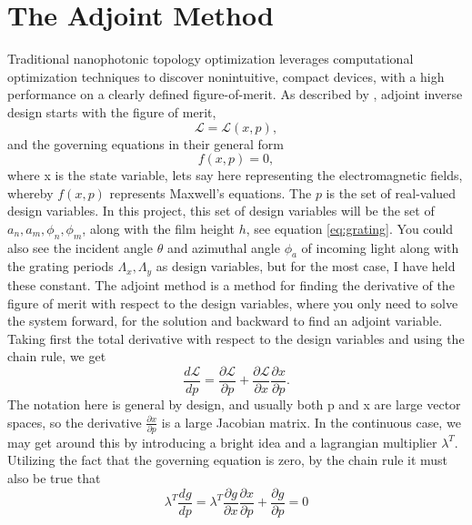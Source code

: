 \section{The Adjoint Method}
\label{sec:adjoint}
Traditional nanophotonic topology optimization leverages computational optimization techniques to discover nonintuitive, compact devices, with a high performance
on a clearly defined figure-of-merit. As described by \cite{Hughes2018}, adjoint inverse design starts with the figure of merit,
\begin{equation}
\label{eq:FoM}
\mathcal{L}=\mathcal{L}(x,p),
\end{equation}
and the governing equations in their general form
\begin{equation}
\label{eq:constrainAdjoint}
f(x,p) = 0,
\end{equation}
where x is the state variable, lets say here representing the
electromagnetic fields, whereby $f(x,p)$ represents Maxwell's equations. The  $p$ is the set of real-valued design variables. In this project, this set of design variables will be the set of $a_n,a_m,\phi_n,\phi_m$, along with the film height $h$, see equation \ref{eq:grating}. You could also see the incident angle $\theta$ and azimuthal angle $\phi_a$ of incoming light 
along with the grating periods $\Lambda_x,\Lambda_y$ as design variables, but for the most case, I have held these constant.
The adjoint method is a method for finding the derivative of the figure of merit with respect to the design variables, where you only need to solve the system forward, for the solution and backward to find an adjoint variable.
Taking first the total derivative with respect to the design variables and using the chain rule, we get
\begin{equation}
\label{eq:totalDeriv}
\frac{d\mathcal{L}}{d p} = \frac{\partial\mathcal{L}}{\partial p} + \frac{\partial\mathcal{L}}{\partial x}\frac{\partial x}{\partial p}.
\end{equation}
The notation here is general by design, and usually both p and x are large vector spaces, so the derivative $\frac{\partial x}{\partial p}$ is a large Jacobian matrix.
In the continuous case, we may get around this by introducing a bright idea and a lagrangian multiplier $\lambda^T$. Utilizing the fact that the governing equation is zero, by the chain rule it must also be true that
\begin{equation}
\label{eq:chainrulegovern}
\lambda^T\frac{dg}{dp} = \lambda^T\frac{\partial g }{\partial x}\frac{\partial x }{\partial p} + \frac{\partial g}{\partial p} = 0
\end{equation}
